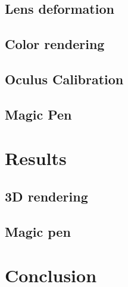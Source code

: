 \documentclass[12pt]{article}
\begin{document}
\subsection{Lens deformation}
\subsection{Color rendering}
\subsection{Oculus Calibration}
\subsection{Magic Pen}

\newpage
\section{Results}
\subsection{3D rendering}
\subsection{Magic pen}

\newpage
\section*{Conclusion}

\newpage
{}


\end{document}
